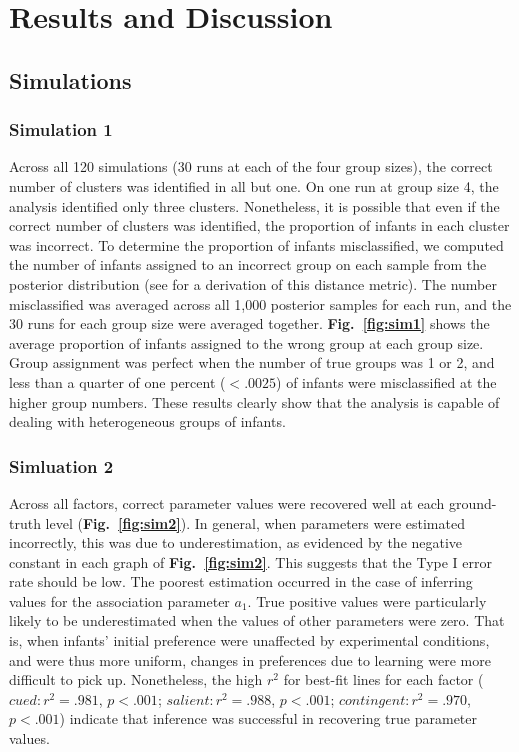 \documentclass[12pt]{article}
\begin{document}
\section*{Results and Discussion}

\subsection*{Simulations}

\subsubsection*{Simulation 1}

	Across all 120 simulations (30 runs at each of the four group sizes), the correct number of clusters was identified in all but one. On one run at group size 4, the analysis identified only three clusters. Nonetheless, it is possible that even if the correct number of clusters was identified, the proportion of infants in each cluster was incorrect. To determine the proportion of infants misclassified, we computed the number of infants assigned to an incorrect group on each sample from the posterior distribution (see \cite{Cha2002} for a derivation of this distance metric). The number misclassified was averaged across all 1,000 posterior samples for each run, and the 30 runs for each group size were averaged together. \textbf{Fig.~\ref{fig:sim1}} shows the average proportion of infants assigned to the wrong group at each group size. Group assignment was perfect when the number of true groups was 1 or 2, and less than a quarter of one percent ($< .0025$) of infants were misclassified at the higher group numbers. These results clearly show that the analysis is capable of dealing with heterogeneous groups of infants.

\subsubsection{Simluation 2}

	Across all factors, correct parameter values were recovered well at each ground-truth level (\textbf{Fig.~\ref{fig:sim2}}). In general, when parameters were estimated incorrectly, this was due to underestimation, as evidenced by the negative constant in each graph of \textbf{Fig.~\ref{fig:sim2}}. This suggests that the Type I error rate should be low. The poorest estimation occurred in the case of inferring values for the association parameter $a_{1}$. True positive values were particularly likely to be underestimated when the values of other parameters were zero. That is, when infants' initial preference were unaffected by experimental conditions, and were thus more uniform, changes in preferences due to learning were more difficult to pick up. Nonetheless, the high $r^{2}$ for best-fit lines for each factor ($cued: r^{2}  = .981$, $p < .001$; $salient: r^{2}  = .988$, $p < .001$; $contingent: r^{2} = .970$, $p < .001$) indicate that inference was successful in recovering true parameter values.
\end{document}
